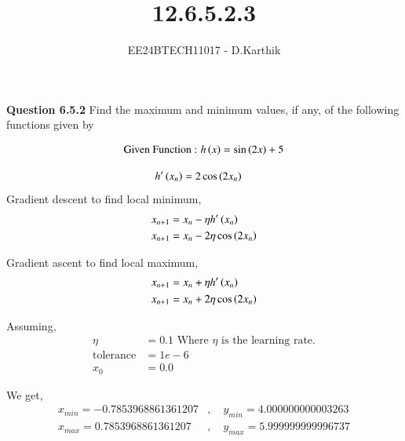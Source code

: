 \documentclass[journal]{IEEEtran}
\begin{document}

\vspace{3cm}

\title{12.6.5.2.3}
\author{EE24BTECH11017 - D.Karthik}
{\let\newpage\relax\maketitle}

\renewcommand{\thefigure}{\theenumi}
\renewcommand{\thetable}{\theenumi}
\setlength{\intextsep}{10pt} %


\renewcommand{\thetable}{\theenumi}

\textbf{Question 6.5.2}
Find the maximum and minimum values, if any, of the following functions
given by

\begin{align}
\text{Given Function :  }
    h\left(x\right) = \sin{\ensuremath{\left(2x\right)}}+5 
\end{align}

\solution
\begin{align}
    h^\prime\left(x_{n}\right) &= 2\cos{\ensuremath{\left(2x_{n}\right)}}
\end{align}
Gradient descent to find local minimum,
\begin{align}
    x_{n+1} &= x_{n} - \eta h^\prime\left(x_{n}\right) \\
    x_{n+1} &= x_{n} - 2\eta \cos{\ensuremath{\left(2x_{n}\right)}}
\end{align}

Gradient ascent to find local maximum,
\begin{align}
    x_{n+1} &= x_{n} + \eta h^\prime\left(x_{n}\right) \\
    x_{n+1} &= x_{n} + 2\eta \cos{\ensuremath{\left(2x_{n}\right)}}
\end{align}



Assuming,
\begin{align}
    \eta &= 0.1   \text{  Where $\eta$ is the learning rate.}\\ 
    \text{tolerance} &= 1e-6 \\
    x_{0} &= 0.0
\end{align}

We get,
\begin{align}
    x_{min} = -0.7853968861361207&,\quad y_{min} = 4.000000000003263 \\
    x_{max} = 0.7853968861361207&,\quad y_{max} = 5.999999999996737
\end{align}
\end{document}
